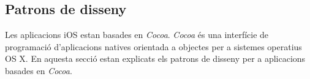 
\subsection{Patrons de disseny}

Les aplicacions iOS estan basades en \textit{Cocoa}. \textit{Cocoa} és una interfície de programació d'aplicacions natives orientada a objectes per a sistemes operatius OS X. En aquesta secció estan explicats els patrons de disseny per a aplicacions basades en \textit{Cocoa}.











